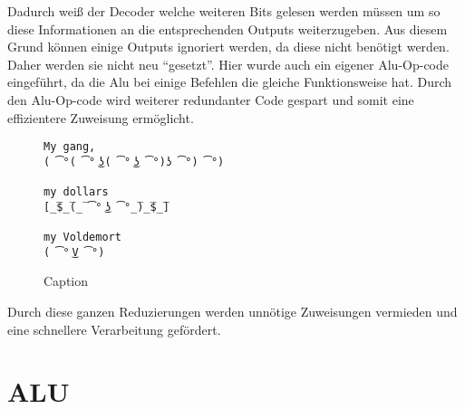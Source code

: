 \documentclass[paper=a4,fontsize=12pt,twocolumn]{scrreprt}
\begin{document}
Dadurch weiß der Decoder welche weiteren Bits gelesen werden müssen um so diese Informationen an die entsprechenden Outputs weiterzugeben.
Aus diesem Grund können einige Outputs ignoriert werden, da diese nicht benötigt werden.
Daher werden sie nicht neu \enquote{gesetzt}.
Hier wurde auch ein eigener Alu-Op-code eingeführt, da die Alu bei einige Befehlen die gleiche Funktionsweise hat.
Durch den Alu-Op-code wird weiterer redundanter Code gespart und somit eine effizientere Zuweisung ermöglicht.


\begin{figure}
    \centering
    \begin{lstlisting}
My gang,
( ͡°( ͡° ͜ʖ( ͡° ͜ʖ ͡°)ʖ ͡°) ͡°)

my dollars
[̲̅$̲̅(̲̅ ͡° ͜ʖ ͡°̲̅)̲̅$̲̅]

my Voldemort
( ͡° ͜V ͡°)
    \end{lstlisting}
    \caption{Caption}
    \label{fig:my_label}
\end{figure}

Durch diese ganzen Reduzierungen werden unnötige Zuweisungen vermieden und eine schnellere Verarbeitung gefördert.



\section{ALU}
\end{document}
